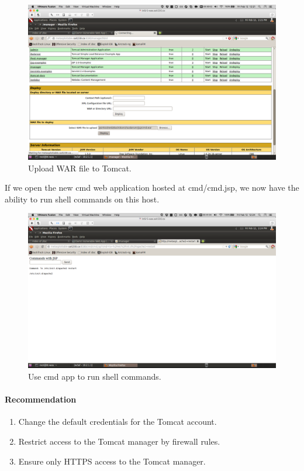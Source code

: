 \documentclass{article}
\begin{document}
\begin{figure}[h!]
	\includegraphics[width=\linewidth]{images/tomcat-metasploitable-upload.png}
	\caption{Upload WAR file to Tomcat.}
	\label{fig:tomcat-injection4}
\end{figure}

\newpage
If we open the new cmd web application hosted at cmd/cmd.jsp, we now have the
ability to run shell commands on this host.

\begin{figure}[h!]
	\includegraphics[width=\linewidth]{images/tomcat-metasploitable-cmd.png}
	\caption{Use cmd app to run shell commands.}
	\label{fig:tomcat-injection5}
\end{figure}

\paragraph{Recommendation}

\begin{enumerate}
  \item Change the default credentials for the Tomcat account.
  \item Restrict access to the Tomcat manager by firewall rules.
  \item Ensure only HTTPS access to the Tomcat manager.
\end{enumerate}
\end{document}
